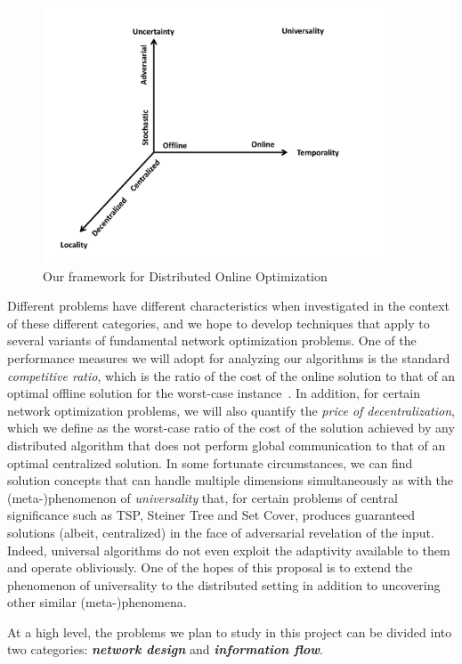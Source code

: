 \begin{figure}
\centering
\includegraphics[width=4in]{dimensions-rev.pdf}
\caption{Our framework for Distributed Online Optimization}
\label{fig:dimensions}
\end{figure}

Different problems have different characteristics when investigated in
the context of these different categories, and we hope to develop
techniques that apply to several variants of fundamental network
optimization problems.  One of the performance measures we will adopt
for analyzing our algorithms is the standard {\em competitive ratio},
which is the ratio of the cost of the online solution to that of an
optimal offline solution for the worst-case
instance~\cite{be98,sleator+t:cache}.  In addition, for certain
network optimization problems, we will also quantify the {\em price of
  decentralization}, which we define as the worst-case ratio of the
cost of the solution achieved by any distributed algorithm that does
not perform global communication to that of an optimal centralized
solution.  In some fortunate circumstances, we can find solution
concepts that can handle multiple dimensions simultaneously as with
the (meta-)phenomenon of {\em universality} \cite{jia+lnrs:universal} that,
for certain problems of central significance such as TSP, Steiner Tree
and Set Cover, produces guaranteed solutions (albeit, centralized) in
the face of adversarial revelation of the input.  Indeed, universal
algorithms do not even exploit the adaptivity available to them and
operate obliviously.  One of the hopes of this proposal is to extend
the phenomenon of universality to the distributed setting in addition
to uncovering other similar (meta-)phenomena.

At a high level, the problems we plan to study in this project can be
divided into two categories: {\bf \em network design}\/ and {\bf \em
information flow}.
\medskip

